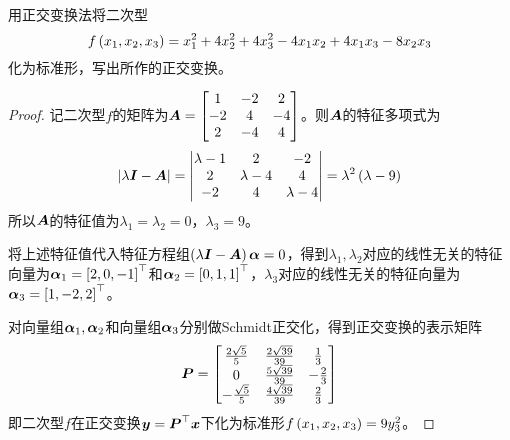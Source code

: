 \begin{problem}
用正交变换法将二次型
\begin{equation*}
    f\left( x_1,x_2,x_3 \right)=x_1^2+4x_2^2+4x_3^2-4x_1x_2+4x_1x_3-8x_2x_3
\end{equation*}
化为标准形，写出所作的正交变换。
\end{problem}
\begin{proof}
    记二次型\(f\)的矩阵为\(\boldsymbol{A}=\begin{bmatrix}1&-2&2\\-2&4&-4\\2&-4&4\end{bmatrix}\)。则\(\boldsymbol{A}\)的特征多项式为
    \begin{equation*}
        \left|\lambda\boldsymbol{I}-\boldsymbol{A} \right|=\begin{vmatrix}\lambda-1&2&-2\\2&\lambda-4&4\\-2&4&\lambda-4\end{vmatrix}=\lambda^2\left( \lambda-9 \right)
    \end{equation*}
    所以\(\boldsymbol{A}\)的特征值为\(\lambda_1=\lambda_2=0\)，\(\lambda_3=9\)。

    将上述特征值代入特征方程组\(\left( \lambda\boldsymbol{I}-\boldsymbol{A} \right)\boldsymbol{\alpha}=0\)，得到\(\lambda_1,\lambda_2\)对应的线性无关的特征向量为\(\boldsymbol{\alpha}_1=\left[ 2,0,-1 \right]^\top\)和\(\boldsymbol{\alpha}_2=\left[ 0,1,1 \right]^\top\)，\(\lambda_3\)对应的线性无关的特征向量为\(\boldsymbol{\alpha}_3=\left[ 1,-2,2 \right]^\top\)。

    对向量组\(\boldsymbol{\alpha}_1,\boldsymbol{\alpha}_2\)和向量组\(\boldsymbol{\alpha}_3\)分别做Schmidt正交化，得到正交变换的表示矩阵
    \begin{equation*}
        \boldsymbol{P}=
        \begin{bmatrix}
            \frac{2\sqrt{5}}{5} & \frac{2\sqrt{39}}{39} & \frac{1}{3}  \\
            0                   & \frac{5\sqrt{39}}{39} & -\frac{2}{3} \\
            -\frac{\sqrt{5}}{5} & \frac{4\sqrt{39}}{39} & \frac{2}{3}
        \end{bmatrix}
    \end{equation*}
    即二次型\(f\)在正交变换\(\boldsymbol{y}=\boldsymbol{P}^\top\boldsymbol{x}\)下化为标准形\(f\left( x_1,x_2,x_3 \right)=9y_3^2\)。
\end{proof}

